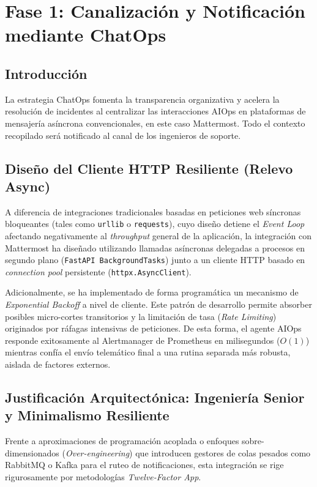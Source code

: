 \chapter{Fase 1: Canalización y Notificación mediante ChatOps}

\section{Introducción}
La estrategia ChatOps fomenta la transparencia organizativa y acelera la resolución de incidentes al centralizar las interacciones AIOps en plataformas de mensajería asíncrona convencionales, en este caso Mattermost. Todo el contexto recopilado será notificado al canal de los ingenieros de soporte.

\section{Diseño del Cliente HTTP Resiliente (Relevo Async)}
A diferencia de integraciones tradicionales basadas en peticiones web síncronas bloqueantes (tales como \texttt{urllib} o \texttt{requests}), cuyo diseño detiene el \textit{Event Loop} afectando negativamente al \textit{throughput} general de la aplicación, la integración con Mattermost ha diseñado utilizando llamadas asíncronas delegadas a procesos en segundo plano (\texttt{FastAPI BackgroundTasks}) junto a un cliente HTTP basado en \textit{connection pool} persistente (\texttt{httpx.AsyncClient}).

Adicionalmente, se ha implementado de forma programática un mecanismo de \textit{Exponential Backoff} a nivel de cliente. Este patrón de desarrollo permite absorber posibles micro-cortes transitorios y la limitación de tasa (\textit{Rate Limiting}) originados por ráfagas intensivas de peticiones. De esta forma, el agente AIOps responde exitosamente al Alertmanager de Prometheus en milisegundos ($O(1)$) mientras confía el envío telemático final a una rutina separada más robusta, aislada de factores externos.

\section{Justificación Arquitectónica: Ingeniería Senior y Minimalismo Resiliente}
Frente a aproximaciones de programación acoplada o enfoques sobre-dimensionados (\textit{Over-engineering}) que introducen gestores de colas pesados como RabbitMQ o Kafka para el ruteo de notificaciones, esta integración se rige rigurosamente por metodologías \textit{Twelve-Factor App}.

